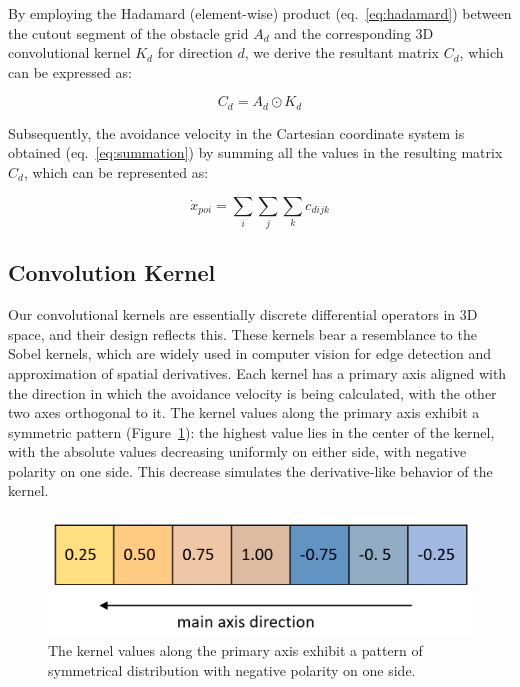 \documentclass[a4paper]{article}
\begin{document}
By employing the Hadamard (element-wise) product (eq.~\ref{eq:hadamard}) between the cutout segment of the obstacle grid \(A_d\) and the corresponding 3D convolutional kernel \(K_d\) for direction \(d\), we derive the resultant matrix \(C_d\), which can be expressed as:

\begin{equation}
	C_d = A_d \odot K_d
	\label{eq:hadamard}
\end{equation}

Subsequently, the avoidance velocity in the Cartesian coordinate system is obtained (eq.~\ref{eq:summation}) by summing all the values in the resulting matrix $C_d$, which can be represented as:

\begin{equation}
	\dot{x}_{poi} = \sum_{i}\sum_{j}\sum_{k} c_{dijk} 
	\label{eq:summation}
\end{equation}

\subsection{Convolution Kernel}

Our convolutional kernels are essentially discrete differential operators in 3D space, and their design reflects this. These kernels bear a resemblance to the Sobel kernels, which are widely used in computer vision for edge detection and approximation of spatial derivatives. Each kernel has a primary axis aligned with the direction in which the avoidance velocity is being calculated, with the other two axes orthogonal to it. The kernel values along the primary axis exhibit a symmetric pattern (Figure~\ref{Kernel main axis}): the highest value lies in the center of the kernel, with the absolute values decreasing uniformly on either side, with negative polarity on one side. This decrease simulates the derivative-like behavior of the kernel.

\begin{figure}[H]
	\centering
	\includegraphics[width=0.8\linewidth]{kernel-mainvalues-colored.png}
	\caption{The kernel values along the primary axis exhibit a pattern of symmetrical distribution with negative polarity on one side.} 
	\label{Kernel main axis}
\end{figure}
\end{document}
